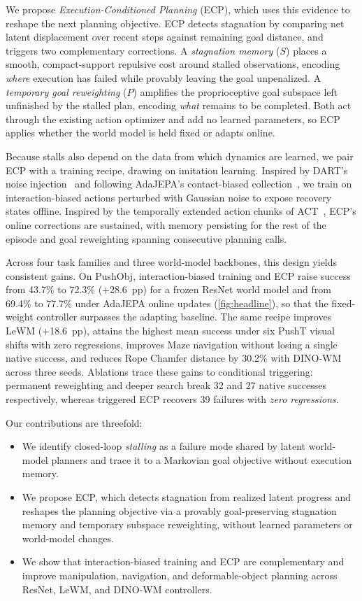 We propose \emph{Execution-Conditioned Planning} (ECP), which uses this evidence to reshape the next planning objective. ECP detects stagnation by comparing net latent displacement over recent steps against remaining goal distance, and triggers two complementary corrections. A \emph{stagnation memory} ($S$) places a smooth, compact-support repulsive cost around stalled observations, encoding \emph{where} execution has failed while provably leaving the goal unpenalized. A \emph{temporary goal reweighting} ($P$) amplifies the proprioceptive goal subspace left unfinished by the stalled plan, encoding \emph{what} remains to be completed. Both act through the existing action optimizer and add no learned parameters, so ECP applies whether the world model is held fixed or adapts online.

Because stalls also depend on the data from which dynamics are learned, we pair ECP with a training recipe, drawing on imitation learning. Inspired by DART's noise injection~\cite{laskey2017dart} and following AdaJEPA's contact-biased collection~\cite{wang2026adajepa}, we train on interaction-biased actions perturbed with Gaussian noise to expose recovery states offline. Inspired by the temporally extended action chunks of ACT~\cite{zhao2023act}, ECP's online corrections are sustained, with memory persisting for the rest of the episode and goal reweighting spanning consecutive planning calls.

Across four task families and three world-model backbones, this design yields consistent gains. On PushObj, interaction-biased training and ECP raise success from 43.7\% to 72.3\% (+28.6~pp) for a frozen ResNet world model and from 69.4\% to 77.7\% under AdaJEPA online updates (\cref{fig:headline}), so that the fixed-weight controller surpasses the adapting baseline. The same recipe improves LeWM (+18.6~pp), attains the highest mean success under six PushT visual shifts with zero regressions, improves Maze navigation without losing a single native success, and reduces Rope Chamfer distance by 30.2\% with DINO-WM across three seeds. Ablations trace these gains to conditional triggering: permanent reweighting and deeper search break 32 and 27 native successes respectively, whereas triggered ECP recovers 39 failures with \emph{zero regressions}.

Our contributions are threefold:
\begin{itemize}[leftmargin=*,itemsep=1pt,topsep=2pt,label=$\bullet$]
\item We identify closed-loop \emph{stalling} as a failure mode shared by latent world-model planners and trace it to a Markovian goal objective without execution memory.
\item We propose ECP, which detects stagnation from realized latent progress and reshapes the planning objective via a provably goal-preserving stagnation memory and temporary subspace reweighting, without learned parameters or world-model changes.
\item We show that interaction-biased training and ECP are complementary and improve manipulation, navigation, and deformable-object planning across ResNet, LeWM, and DINO-WM controllers.
\end{itemize}
